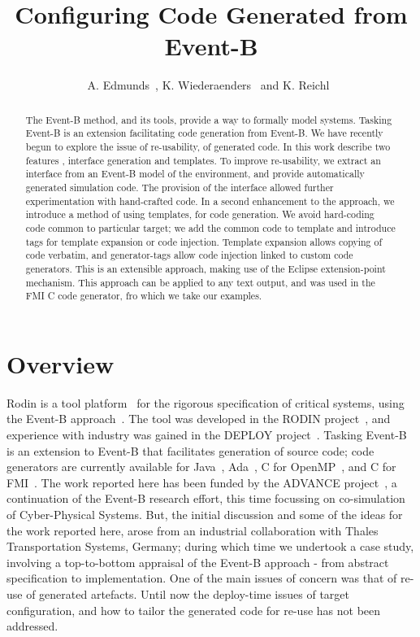 \documentclass{llncs}%
\begin{document}
%
\title{Configuring Code Generated from Event-B}

\author{A. Edmunds~, K. Wiederaenders~ and K. Reichl~}


\maketitle
%
\begin{abstract}
The Event-B method, and  its tools, provide a way to formally model systems. Tasking Event-B is an extension facilitating code generation from Event-B.  We have recently begun to explore the issue of re-usability, of generated code. In this work describe two features , interface generation and templates. To improve re-usability, we extract an interface from an Event-B model of the environment, and provide automatically generated simulation code. The provision of the interface allowed further experimentation with hand-crafted code. In a second enhancement to the approach, we introduce a method of using templates, for code generation. We avoid hard-coding code common to particular target; we add the common code to template and introduce tags for template expansion or code injection. Template expansion allows copying of code verbatim, and generator-tags allow code injection linked to custom code generators. This is an extensible approach, making use of the Eclipse extension-point mechanism. This approach can be applied to any text output, and was used in the FMI C code generator, fro which we take our examples. 
 \end{abstract}
%
%
\section{Overview}
%
Rodin is a  tool platform~\cite{abrial10rodin} for the rigorous specification of critical systems, using the Event-B approach~\cite{ABR10}. The tool was developed in the RODIN project~\cite{RodinTool}, and experience with industry was gained in the DEPLOY project~\cite{DEPLOY}. Tasking Event-B~\cite{Edmunds2009,Edmunds2008,ae2011a,ae2012b} is an extension to Event-B that facilitates generation of source code; code generators are currently available for Java~\cite{JavaSpec}, Ada~\cite{ada2005}, C for OpenMP~\cite{openmp}, and C for FMI~\cite{FMISTD}. The work reported here has been funded by the ADVANCE project~\cite{advance}, a continuation of the Event-B research effort, this time focussing on co-simulation of Cyber-Physical Systems. But, the initial discussion and some of the ideas for the work reported here, arose from an industrial collaboration with Thales Transportation Systems, Germany; during which time we undertook a case study, involving a top-to-bottom appraisal of the Event-B approach - from abstract specification to implementation. One of the main issues of concern was that of re-use of generated artefacts. Until now the deploy-time issues of target configuration, and how to tailor the generated code for re-use has not been addressed. 
\end{document}
